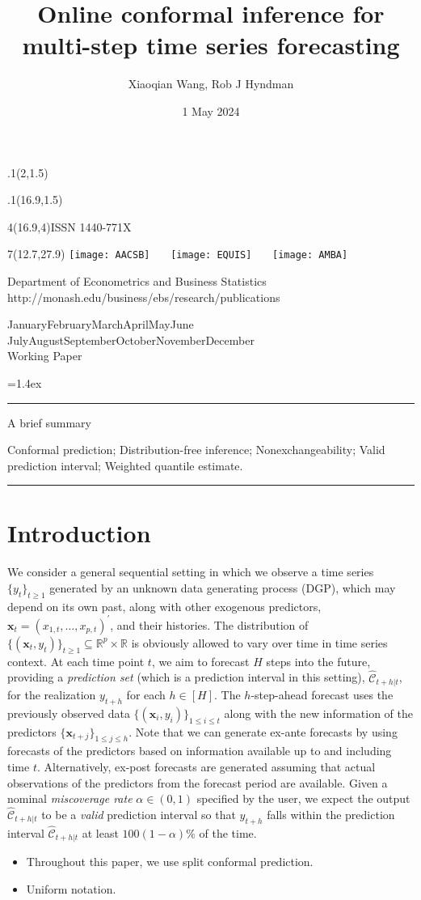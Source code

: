 \documentclass[
  11pt,
  a4paper,
]{article}
\title{Online conformal inference for multi-step time series
forecasting}
\date{1 May 2024}
\author{Xiaoqian Wang, Rob J Hyndman}
\makeatletter
\theoremstyle{plain}
\theoremstyle{plain}
\theoremstyle{remark}
\def\placefig#1#2#3#4{\begin{textblock}{.1}(#1,#2)\rlap{\texttt{[image: \#4]}}\end{textblock}}
\def\Date{\number\day}
\def\Month{\ifcase\month\or
 January\or February\or March\or April\or May\or June\or
 July\or August\or September\or October\or November\or December\fi}
\def\Year{\number\year}
\def\showjel{{\large\textsf{\textbf{JEL classification:}}~\@jel}}
\def\cover{{\sffamily\setcounter{page}{0}
        \thispagestyle{empty}
        \placefig{2}{1.5}{width=5cm}{monash2}
        \placefig{16.9}{1.5}{width=2.1cm}{MBSportrait}
        \begin{textblock}{4}(16.9,4)ISSN 1440-771X\end{textblock}
        \begin{textblock}{7}(12.7,27.9)\hfill
        \texttt{[image: AACSB]}~~~
        \texttt{[image: EQUIS]}~~~
        \texttt{[image: AMBA]}
        \end{textblock}
        \vspace*{2.5cm}
        \begin{center}\Large
        Department of Econometrics and Business Statistics\\[.5cm]
        \footnotesize http://monash.edu/business/ebs/research/publications
        \end{center}\vspace{2cm}
        \begin{center}
        \fbox{\parbox{14cm}{\begin{onehalfspace}\centering\Huge\vspace*{0.3cm}
                \textsf{\textbf{\expandafter{\@title}}}\vspace{1cm}\par
                \LARGE
                \expandafter{\@author}
                \end{onehalfspace}
        }}
        \end{center}
        \vfill
                \begin{center}\Large
                \Month~\Year\\[1cm]
                Working Paper \@wp
        \end{center}\vspace*{2cm}}}
\def\pageone{{\sffamily\setstretch{1}%
        \thispagestyle{empty}%
        \vbox to \textheight{%
        \raggedright\baselineskip=1.2cm
     {\fontsize{24.88}{30}\sffamily\textbf{\expandafter{\@title}}}
        \vspace{2cm}\par
        \hspace{1cm}\parbox{14cm}{\sffamily\large\@addresses}\vspace{1cm}\vfill
        \hspace{1cm}{\large\Date~\Month~\Year}\\[1cm]
        \hspace{1cm}\showjel\vss}}}
\def\blindtitle{{\sffamily
     \thispagestyle{plain}\raggedright\baselineskip=1.2cm
     {\fontsize{24.88}{30}\sffamily\textbf{\expandafter{\@title}}}\vspace{1cm}\par
        }}
\def\titlepage{{\cover\newpage\pageone\newpage\blindtitle}}
\let\maketitle\titlepage
\newenvironment{keywords}{\par\vspace{0.5cm}\noindent{\sffamily\textbf{Keywords:}}}{\vspace{0.25cm}\par\hrule\vspace{0.5cm}\par}
\renewenvironment{abstract}{\begin{minipage}{\textwidth}\parskip=1.4ex\noindent
\hrule\vspace{0.1cm}\par{\sffamily\textbf{\abstractname}}\newline\setstretch{1}}
  {\end{minipage}}
\makeatother
\begin{document}
\maketitle

\begin{abstract}
A brief summary
\end{abstract}

\begin{keywords}
  Conformal prediction; Distribution-free
inference; Nonexchangeability; Valid prediction interval; 
  Weighted quantile estimate.
\end{keywords}

\section{Introduction}\label{sec-intro}

We consider a general sequential setting in which we observe a time
series \(\{y_t\}_{t \geq 1}\) generated by an unknown data generating
process (DGP), which may depend on its own past, along with other
exogenous predictors, \(\bm{x}_t=(x_{1,t},\ldots,x_{p,t})^{\prime}\),
and their histories. The distribution of
\(\{(\bm{x}_t, y_t)\}_{t \geq 1} \subseteq \mathbb{R}^p \times \mathbb{R}\)
is obviously allowed to vary over time in time series context. At each
time point \(t\), we aim to forecast \(H\) steps into the future,
providing a \emph{prediction set} (which is a prediction interval in
this setting), \(\hat{\mathcal{C}}_{t+h|t}\), for the realization
\(y_{t+h}\) for each \(h\in[H]\). The \(h\)-step-ahead forecast uses the
previously observed data \(\{(\bm{x}_i, y_i)\}_{1 \leq i \leq t}\) along
with the new information of the predictors
\(\{\bm{x}_{t+j}\}_{1\leq j\leq h}\). Note that we can generate ex-ante
forecasts by using forecasts of the predictors based on information
available up to and including time \(t\). Alternatively, ex-post
forecasts are generated assuming that actual observations of the
predictors from the forecast period are available. Given a nominal
\emph{miscoverage rate} \(\alpha \in (0,1)\) specified by the user, we
expect the output \(\hat{\mathcal{C}}_{t+h|t}\) to be a \emph{valid}
prediction interval so that \(y_{t+h}\) falls within the prediction
interval \(\hat{\mathcal{C}}_{t+h|t}\) at least \(100(1-\alpha)\%\) of
the time.

\begin{itemize}
\item
  Throughout this paper, we use split conformal prediction.
\item
  Uniform notation.
\end{itemize}
\end{document}
